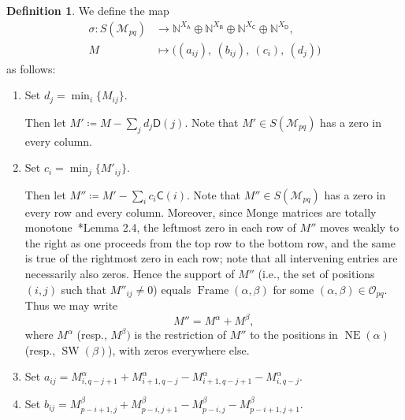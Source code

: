 \documentclass[noamsfonts,10pt]{amsart}
\newcommand{\N}{\mathbb{N}}
\newcommand{\M}{\mathcal{M}}
\newcommand{\al}{\alpha}
\newcommand{\be}{\beta}
\DeclareMathOperator{\Fr}{Frame}
\renewcommand{\O}{\mathcal{O}}
\newcommand{\NE}[1]{\operatorname{NE}(#1)}
\newcommand{\SW}[1]{\operatorname{SW}(#1)}
\newcommand{\sA}{\mathsf{A}}
\newcommand{\sB}{\mathsf{B}}
\newcommand{\sC}{\mathsf{C}}
\newcommand{\sD}{\mathsf{D}}
\newcommand{\1}{\mathbf{1}}
\theoremstyle{plain}
\theoremstyle{definition}
\newtheorem{dfn}[theorem]{Definition}
\numberwithin{equation}{section}
\begin{document}
\begin{dfn}
    \label{def:sigma}
    We define the map
    \begin{align*}
        \sigma : S(\M_{pq}) &\longrightarrow \N^{X_{\sA}} \oplus \N^{X_{\sB}} \oplus \N^{X_{\sC}} \oplus \N^{X_{\sD}}, \\
        M & \longmapsto \Big( (a_{ij}), \: (b_{ij}), \: (c_i), \: (d_j) \Big)
    \end{align*}
    as follows:
    \begin{enumerate}
        \item \label{dj} Set $d_j = \min_i \{ M_{ij} \}$.
        
        Then let $M' \coloneqq M - \sum_{j} d_j \sD(j)$.
        Note that $M' \in S(\M_{pq})$ has a zero in every column.
        
        \item \label{ci} Set $c_i = \min_j \{M'_{ij} \}$.

        Then let $M'' \coloneqq M' - \sum_{i} c_i \sC(i)$.
        Note that $M'' \in S(\M_{pq})$ has a zero in every row and every column.
        Moreover, since Monge matrices are totally monotone~\cite{Burkard}*{Lemma 2.4}, the leftmost zero in each row of $M''$ moves weakly to the right as one proceeds from the top row to the bottom row, and the same is true of the rightmost zero in each row;
        note that all intervening entries are necessarily also zeros.
        Hence the support of $M''$ (i.e., the set of positions $(i,j)$ such that $M''_{ij} \neq 0$) equals $\Fr(\al,\be)$ for some $(\al,\be) \in \O_{pq}$.
        Thus we may write 
        \[
            M'' = M^\al + M^\be,
        \]
        where $M^\al$ (resp., $M^\be)$ is the restriction of $M''$ to the positions in $\NE{\al}$ (resp., $\SW{\be}$), with zeros everywhere else.
        
        \item \label{aij} Set $a_{ij} = 
        M^\al_{i,q-j+1} + M^\al_{i+1,q-j} - M^\al_{i+1,q-j+1} - M^\al_{i,q-j}$.

        \item \label{bij} Set $b_{ij} = 
        M^\be_{p-i+1,j} + M^\be_{p-i,j+1} - M^\be_{p-i,j} - M^\be_{p-i+1,j+1}$.
        
    \end{enumerate}
\end{dfn}
\end{document}
